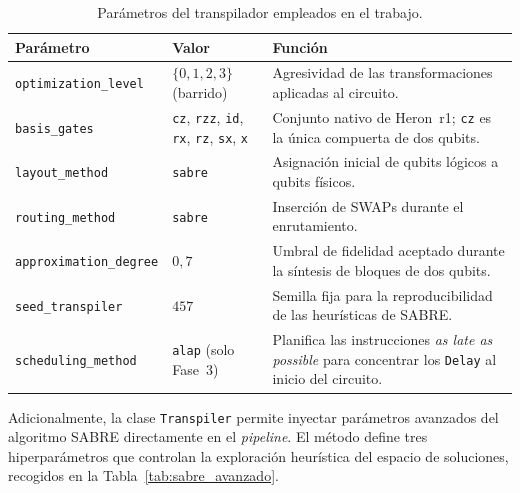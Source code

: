 \documentclass[12pt, spanish]{book}
\begin{document}
\begin{table}[H]
    \centering
    \caption{Parámetros del transpilador empleados en el trabajo.}
    \label{tab:transpilador_config}
    \footnotesize
    \begin{tabular}{p{} p{} p{}}
        \toprule
        \textbf{Parámetro} & \textbf{Valor} & \textbf{Función} \\
        \midrule
        \texttt{optimization\_level}
            & $\{0, 1, 2, 3\}$ (barrido)
            & Agresividad de las transformaciones aplicadas al circuito. \\
        \midrule
        \texttt{basis\_gates}
            & \texttt{cz}, \texttt{rzz}, \texttt{id}, \texttt{rx}, \texttt{rz}, \texttt{sx}, \texttt{x}
            & Conjunto nativo de Heron~r1; \texttt{cz} es la única compuerta de dos qubits. \\
        \midrule
        \texttt{layout\_method}
            & \texttt{sabre}
            & Asignación inicial de qubits lógicos a qubits físicos. \\
        \midrule
        \texttt{routing\_method}
            & \texttt{sabre}
            & Inserción de SWAPs durante el enrutamiento. \\
        \midrule
        \texttt{approximation\_degree}
            & $0{,}7$
            & Umbral de fidelidad aceptado durante la síntesis de bloques de dos qubits. \\
        \midrule
        \texttt{seed\_transpiler}
            & $457$
            & Semilla fija para la reproducibilidad de las heurísticas de SABRE. \\
        \midrule
        \texttt{scheduling\_method}
            & \texttt{alap} (solo Fase~3)
            & Planifica las instrucciones \textit{as late as possible} para concentrar los \texttt{Delay} al inicio del circuito. \\
        \bottomrule
    \end{tabular}
\end{table}

Adicionalmente, la clase \texttt{Transpiler} permite inyectar parámetros avanzados del algoritmo SABRE directamente en el \textit{pipeline}. El método  define tres hiperparámetros que controlan la exploración heurística del espacio de soluciones, recogidos en la Tabla~\ref{tab:sabre_avanzado}.
\end{document}
